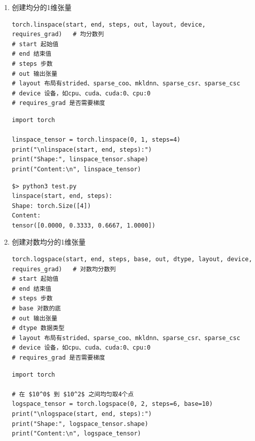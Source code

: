 \begin{enumerate}[label=\arabic*)]
\begin{lstlisting}[style=pythonstyle]
arange_tensor = torch.arange(2, 20, step=3)
print("\narange(start, end, step):")
print("Shape:", arange_tensor.shape)
print("Content:\n", arange_tensor)
\end{lstlisting}
\begin{lstlisting}[style=demostyle,numbers=none]
$> python3 test.py
arange(start, end, step):
Shape: torch.Size([6])
Content:
tensor([ 2,  5,  8, 11, 14, 17])
\end{lstlisting}

\item 创建均分的\textcolor{YBXPurple}{1维}张量
\begin{lstlisting}[style=demostyle,numbers=none]
torch.linspace(start, end, steps, out, layout, device, requires_grad)   # 均分数列
# start 起始值
# end 结束值
# steps 步数
# out 输出张量
# layout 布局有strided、sparse_coo、mkldnn、sparse_csr、sparse_csc
# device 设备，如cpu、cuda、cuda:0、cpu:0
# requires_grad 是否需要梯度
\end{lstlisting}
\begin{lstlisting}[style=pythonstyle]
import torch

linspace_tensor = torch.linspace(0, 1, steps=4)
print("\nlinspace(start, end, steps):")
print("Shape:", linspace_tensor.shape)
print("Content:\n", linspace_tensor)
\end{lstlisting}
\begin{lstlisting}[style=demostyle,numbers=none]
$> python3 test.py
linspace(start, end, steps):
Shape: torch.Size([4])
Content:
tensor([0.0000, 0.3333, 0.6667, 1.0000])
\end{lstlisting}

\item 创建\textcolor{YBXPurple}{对数均分}的\textcolor{YBXPurple}{1维}张量
\begin{lstlisting}[style=demostyle,numbers=none]
torch.logspace(start, end, steps, base, out, dtype, layout, device, requires_grad)   # 对数均分数列
# start 起始值
# end 结束值
# steps 步数
# base 对数的底
# out 输出张量
# dtype 数据类型
# layout 布局有strided、sparse_coo、mkldnn、sparse_csr、sparse_csc
# device 设备，如cpu、cuda、cuda:0、cpu:0
# requires_grad 是否需要梯度
\end{lstlisting}
\begin{lstlisting}[style=pythonstyle,mathescape=true]
import torch

# 在 $10^0$ 到 $10^2$ 之间均匀取4个点
logspace_tensor = torch.logspace(0, 2, steps=6, base=10)
print("\nlogspace(start, end, steps):")
print("Shape:", logspace_tensor.shape)
print("Content:\n", logspace_tensor)


\end{lstlisting}
\end{enumerate}
